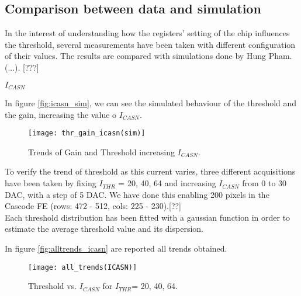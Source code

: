 \begin{comment}
pag.97 tesi
This modification has significant consequences in several design aspects such as the bandwidth, gain, noise and threshold dispersion resulting in a different front-end behavior
\end{comment}


\subsection{Comparison between data and simulation}

In the interest of understanding how the registers' setting of the chip influences the threshold, several measurements have been taken with different configuration of their values.
The results are compared with simulations done by Hung Pham.  (...). [???]

\begin{description}
\item[\textbf{$I_{CASN}$}] 
\end{description}

In figure \vref{fig:icasn_sim}, we can see the simulated behaviour of the threshold and the gain, increasing the value o $I_{CASN}$.

\begin{figure}[h!]
\centering
\texttt{[image: thr\_gain\_icasn(sim)]}
\caption{Trends of Gain and Threshold increasing $I_{CASN}$.}
\label{fig:icasn_sim}
\end{figure}

To verify the trend of threshold as this current varies, three different acquisitions have been taken by fixing $I_{THR}$ = 20, 40, 64 and increasing $I_{CASN}$ from 0  to 30 DAC, with a step of 5 DAC. We have done this enabling 200 pixels in the Cascode FE (rows: 472 - 512, cols: 225 - 230).[??]\\

Each threshold distribution has been fitted with a gaussian function in order to estimate the average threshold value and its dispersion.

In figure \vref{fig:alltrends_icasn} are reported all trends obtained.

\begin{figure}[h!]
\centering
\texttt{[image: all\_trends(ICASN)]}
\caption{Threshold vs. $I_{CASN}$ for $I_{THR}$= 20, 40, 64.}
\label{fig:alltrends_icasn}
\end{figure}

